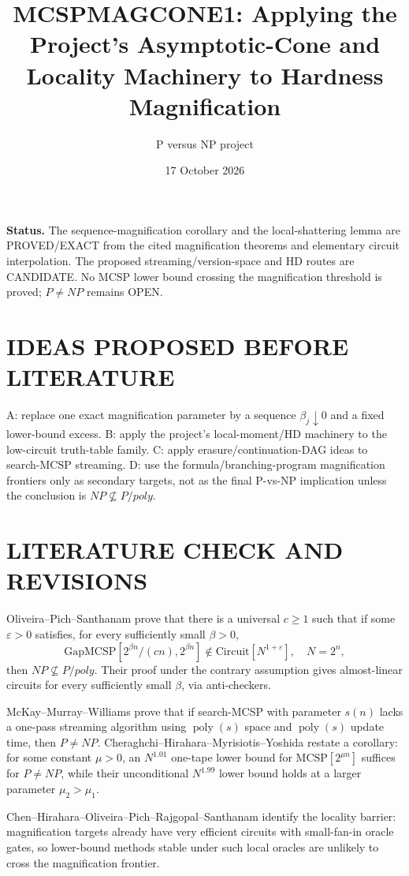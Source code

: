 \documentclass[11pt]{article}
\title{MCSPMAGCONE1: Applying the Project's Asymptotic-Cone and Locality Machinery to Hardness Magnification}
\author{P versus NP project}
\date{17 October 2026}
\begin{document}
\maketitle
\noindent\textbf{Status.} The sequence-magnification corollary and the local-shattering lemma are PROVED/EXACT from the cited magnification theorems and elementary circuit interpolation. The proposed streaming/version-space and HD routes are CANDIDATE. No MCSP lower bound crossing the magnification threshold is proved; $P\ne NP$ remains OPEN.

\section{IDEAS PROPOSED BEFORE LITERATURE}
A: replace one exact magnification parameter by a sequence $\beta_j\downarrow0$ and a fixed lower-bound excess. B: apply the project's local-moment/HD machinery to the low-circuit truth-table family. C: apply erasure/continuation-DAG ideas to search-MCSP streaming. D: use the formula/branching-program magnification frontiers only as secondary targets, not as the final P-vs-NP implication unless the conclusion is $NP\not\subseteq P/poly$.

\section{LITERATURE CHECK AND REVISIONS}
Oliveira--Pich--Santhanam prove that there is a universal $c\ge1$ such that if some $\varepsilon>0$ satisfies, for every sufficiently small $\beta>0$,
\[\mathrm{GapMCSP}[2^{\beta n}/(cn),2^{\beta n}]\notin\mathrm{Circuit}[N^{1+\varepsilon}],\quad N=2^n,\]
then $NP\not\subseteq P/poly$. Their proof under the contrary assumption gives almost-linear circuits for every sufficiently small $\beta$, via anti-checkers.

McKay--Murray--Williams prove that if search-MCSP with parameter $s(n)$ lacks a one-pass streaming algorithm using $\operatorname{poly}(s)$ space and $\operatorname{poly}(s)$ update time, then $P\ne NP$. Cheraghchi--Hirahara--Myrisiotis--Yoshida restate a corollary: for some constant $\mu>0$, an $N^{1.01}$ one-tape lower bound for $\mathrm{MCSP}[2^{\mu n}]$ suffices for $P\ne NP$, while their unconditional $N^{1.99}$ lower bound holds at a larger parameter $\mu_2>\mu_1$.

Chen--Hirahara--Oliveira--Pich--Rajgopal--Santhanam identify the locality barrier: magnification targets already have very efficient circuits with small-fan-in oracle gates, so lower-bound methods stable under such local oracles are unlikely to cross the magnification frontier.
\end{document}
